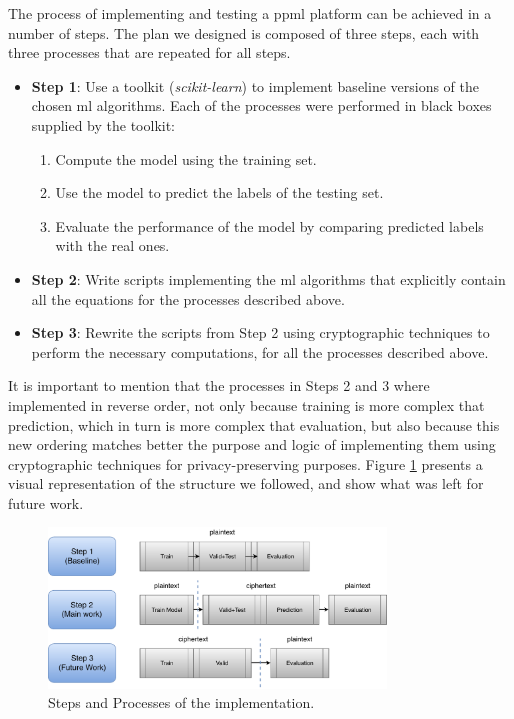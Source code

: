The process of implementing and testing a \ac{ppml} platform can be achieved in a number of steps. The plan we designed is composed of three steps, each with three processes that are repeated for all steps.

\begin{itemize}

	\item \textbf{Step 1}: Use a toolkit (\textit{scikit-learn}) to implement baseline versions of the chosen \ac{ml} algorithms. Each of the processes were performed in black boxes supplied by the toolkit:
	\begin{enumerate}
		\item Compute the model using the training set.
		\item Use the model to predict the labels of the testing set.
		\item Evaluate the performance of the model by comparing predicted labels with the real ones.
	\end{enumerate}
	\item \textbf{Step 2}: Write scripts implementing the \ac{ml} algorithms that explicitly contain all the equations for the processes described above.
	\item \textbf{Step 3}: Rewrite the scripts from Step 2 using cryptographic techniques to perform the necessary computations, for all the processes described above.
\end{itemize}

It is important to mention that the processes in Steps 2 and 3 where implemented in reverse order, not only because training is more complex that prediction, which in turn is more complex that evaluation, but also because this new ordering matches better the purpose and logic of implementing them using cryptographic techniques for privacy-preserving purposes. Figure \ref{fig:steps} presents a visual representation of the structure we followed, and show what was left for future work.

\begin{figure}[ht]
    \centering
    \includegraphics[width=0.80\textwidth]{images/ImplementationSteps.pdf}
    \caption{Steps and Processes of the implementation.}
    \label{fig:steps}
 \end{figure}


